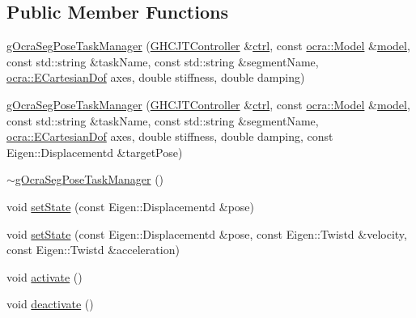 \subsection*{Public Member Functions}
\begin{DoxyCompactItemize}
\item 
\hyperlink{classgocra_1_1gOcraSegPoseTaskManager_a9756a704f7ac1b45084ed1aa44ffc805}{g\+Ocra\+Seg\+Pose\+Task\+Manager} (\hyperlink{classgocra_1_1GHCJTController}{G\+H\+C\+J\+T\+Controller} \&\hyperlink{classgocra_1_1gOcraTaskManagerBase_a52d76d9b54d92f3d31faeaafda99e4c7}{ctrl}, const \hyperlink{classocra_1_1Model}{ocra\+::\+Model} \&\hyperlink{classgocra_1_1gOcraTaskManagerBase_adc439e7170f7120611fc6d009d06404e}{model}, const std\+::string \&task\+Name, const std\+::string \&segment\+Name, \hyperlink{namespaceocra_a436781c7059a0f76027df1c652126260}{ocra\+::\+E\+Cartesian\+Dof} axes, double stiffness, double damping)
\item 
\hyperlink{classgocra_1_1gOcraSegPoseTaskManager_a5bf1af63ef4741f8ac30ce2a042dc9b2}{g\+Ocra\+Seg\+Pose\+Task\+Manager} (\hyperlink{classgocra_1_1GHCJTController}{G\+H\+C\+J\+T\+Controller} \&\hyperlink{classgocra_1_1gOcraTaskManagerBase_a52d76d9b54d92f3d31faeaafda99e4c7}{ctrl}, const \hyperlink{classocra_1_1Model}{ocra\+::\+Model} \&\hyperlink{classgocra_1_1gOcraTaskManagerBase_adc439e7170f7120611fc6d009d06404e}{model}, const std\+::string \&task\+Name, const std\+::string \&segment\+Name, \hyperlink{namespaceocra_a436781c7059a0f76027df1c652126260}{ocra\+::\+E\+Cartesian\+Dof} axes, double stiffness, double damping, const Eigen\+::\+Displacementd \&target\+Pose)
\item 
\hyperlink{classgocra_1_1gOcraSegPoseTaskManager_a0873a055633adab861365426676d3fe3}{$\sim$g\+Ocra\+Seg\+Pose\+Task\+Manager} ()
\item 
void \hyperlink{classgocra_1_1gOcraSegPoseTaskManager_a555cdc369d151ba153bcd681461cde24}{set\+State} (const Eigen\+::\+Displacementd \&pose)
\item 
void \hyperlink{classgocra_1_1gOcraSegPoseTaskManager_a1e1f6ca0ab0e5d174e4810f8123664c3}{set\+State} (const Eigen\+::\+Displacementd \&pose, const Eigen\+::\+Twistd \&velocity, const Eigen\+::\+Twistd \&acceleration)
\item 
void \hyperlink{classgocra_1_1gOcraSegPoseTaskManager_a0fdbbb5fc40c89253fa9d9c83e8aaecc}{activate} ()
\item 
void \hyperlink{classgocra_1_1gOcraSegPoseTaskManager_ab544efb740604150c99b020a5e1f04de}{deactivate} ()
\item 

\end{DoxyCompactItemize}
